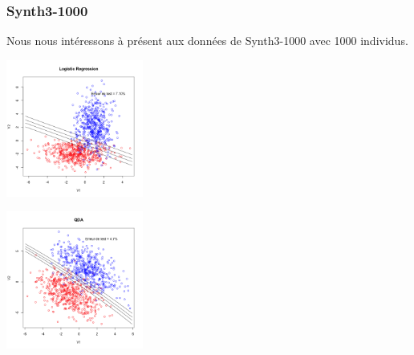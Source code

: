 \documentclass[10pt]{article}
\begin{document}
\subsubsection{Synth3-1000}
Nous nous intéressons à présent aux données de Synth3-1000 avec 1000 individus.

\begin{minipage}{.5\textwidth}
	\includegraphics[width=45mm]{Figures/synth3_lda.png}
\end{minipage}%
\hspace{0.02\linewidth}
\begin{minipage}{.5\textwidth}
	\includegraphics[width=45mm]{Figures/synth3_qda.png}
\end{minipage}
\end{document}
